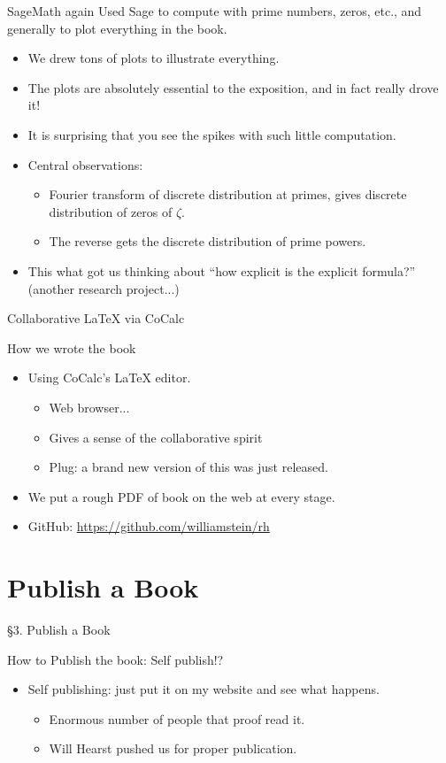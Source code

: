 \documentclass{beamer}
\newcommand{\mysection}[2]{\section{#2}%
\begin{frame}{}
\vfill
\begin{center}
\Huge\sc \S#1. #2
\end{center}
\vfill
\end{frame}}
\begin{document}
\begin{frame}{SageMath again}
  Used Sage to compute with prime numbers, zeros, etc., and generally to plot everything in the book.
  \begin{itemize}
    \item We drew tons of plots to illustrate everything.
    \item The plots are absolutely essential to the exposition, and in fact really drove it!
    \item It is surprising that you see the spikes with such little computation.
    \item Central observations:
          \begin{itemize}
            \item Fourier transform of discrete distribution at primes, gives discrete distribution of zeros of $\zeta$.
            \item The reverse gets the discrete distribution of prime powers.
          \end{itemize}
    \item This what got us thinking about ``how explicit is the explicit formula?'' (another research project...)
  \end{itemize}
\end{frame}


\begin{frame}{Collaborative \LaTeX{} via CoCalc}
  \begin{block}{How we wrote the book}
    \begin{itemize}
      \item Using CoCalc's \LaTeX{} editor.
            \begin{itemize}
              \item Web browser...
              \item Gives a sense of the collaborative spirit
              \item Plug: a brand new version of this was just released.
            \end{itemize}
      \item We put a rough PDF of book on the web at every stage.
      \item GitHub: \url{https://github.com/williamstein/rh}
    \end{itemize}
  \end{block}
\end{frame}


\mysection{3}{Publish a Book}

\begin{frame}{How to Publish the book:  Self publish!?}
  \begin{itemize}
    \item Self publishing: just put it on my website and see what happens.
          \begin{itemize}
            \item Enormous number of people that proof read it.
            \item Will Hearst pushed us for proper publication.
          \end{itemize}
  \end{itemize}
\end{frame}
\end{document}
